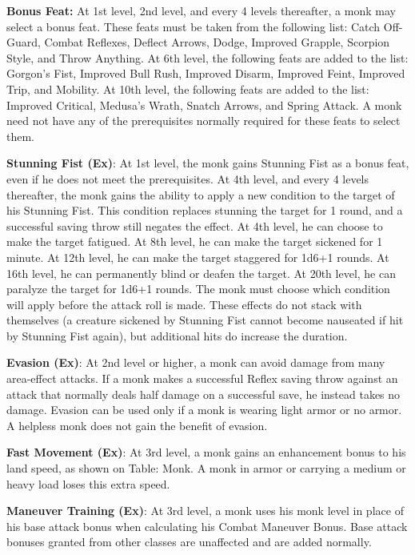 \textbf{Bonus Feat:} At 1st level, 2nd level, and every 4 levels thereafter, a monk may select a bonus feat. These feats must be taken from the following list: Catch Off-Guard, Combat Reflexes, Deflect Arrows, Dodge, Improved Grapple, Scorpion Style, and Throw Anything. At 6th level, the following feats are added to the list: Gorgon's Fist, Improved Bull Rush, Improved Disarm, Improved Feint, Improved Trip, and Mobility. At 10th level, the following feats are added to the list: Improved Critical, Medusa's Wrath, Snatch Arrows, and Spring Attack. A monk need not have any of the prerequisites normally required for these feats to select them.
				
\textbf{Stunning Fist (Ex)}: At 1st level, the monk gains Stunning Fist as a bonus feat, even if he does not meet the prerequisites. At 4th level, and every 4 levels thereafter, the monk gains the ability to apply a new condition to the target of his Stunning Fist. This condition replaces stunning the target for 1 round, and a successful saving throw still negates the effect. At 4th level, he can choose to make the target fatigued. At 8th level, he can make the target sickened for 1 minute. At 12th level, he can make the target staggered for 1d6+1 rounds. At 16th level, he can permanently blind or deafen the target. At 20th level, he can paralyze the target for 1d6+1 rounds. The monk must choose which condition will apply before the attack roll is made. These effects do not stack with themselves (a creature sickened by Stunning Fist cannot become nauseated if hit by Stunning Fist again), but additional hits do increase the duration.
				
\textbf{Evasion (Ex)}: At 2nd level or higher, a monk can avoid damage from many area-effect attacks. If a monk makes a successful Reflex saving throw against an attack that normally deals half damage on a successful save, he instead takes no damage. Evasion can be used only if a monk is wearing light armor or no armor. A helpless monk does not gain the benefit of evasion.
				
\textbf{Fast Movement (Ex)}: At 3rd level, a monk gains an enhancement bonus to his land speed, as shown on Table: Monk. A monk in armor or carrying a medium or heavy load loses this extra speed.
				
\textbf{Maneuver Training (Ex)}: At 3rd level, a monk uses his monk level in place of his base attack bonus when calculating his Combat Maneuver Bonus. Base attack bonuses granted from other classes are unaffected and are added normally.
				
